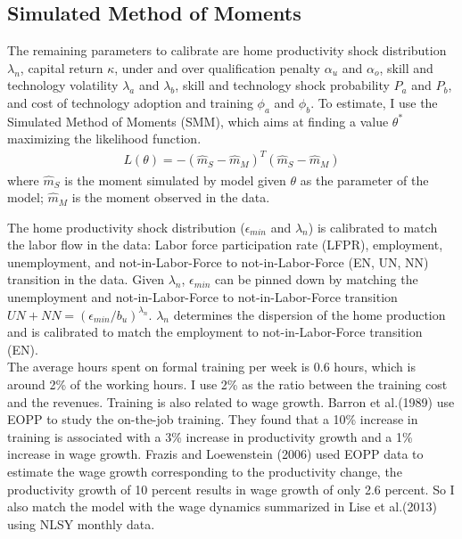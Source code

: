 \documentclass[12pt]{article}
\newcommand{\1}{\mathbb{1}}
\begin{document}
\subsection{Simulated Method of Moments}
The remaining parameters to calibrate are home productivity shock distribution $\lambda_n$, capital return $\kappa$, under and over qualification penalty $\alpha_u$ and $\alpha_o$, skill and technology volatility $\lambda_a$ and $\lambda_b$, skill and technology shock probability $P_a$ and $P_b$, and cost of technology adoption and training $\phi_a$ and $\phi_b$. To estimate, I use the Simulated Method of Moments (SMM), which aims at finding a value $\theta^*$ maximizing the likelihood function. 
\begin{align*}
L(\theta) = -(\hat{m}_S-\hat{m}_M)^T(\hat{m}_S-\hat{m}_M)
\end{align*}
where $\hat{m}_S$ is the moment simulated by model given $\theta$ as the parameter of the model; $\hat{m}_M$ is the moment observed in the data. 

The home productivity shock distribution ($\epsilon_{min}$ and $\lambda_n$) is calibrated to match the labor flow in the data: Labor force participation rate (LFPR), employment, unemployment, and not-in-Labor-Force to not-in-Labor-Force (EN, UN, NN) transition in the data. Given $\lambda_n$, $\epsilon_{min}$ can be pinned down by matching the unemployment and not-in-Labor-Force to not-in-Labor-Force transition $UN+NN = (\epsilon_{min}/b_u)^{\lambda_n}$. $\lambda_n$ determines the dispersion of the home production and is calibrated to match the employment to not-in-Labor-Force transition (EN). \\

The average hours spent on formal training per week is 0.6 hours, which is around 2\% of the working hours. I use 2\% as the ratio between the training cost and the revenues. Training is also related to wage growth. Barron et al.(1989)\cite{Barronetal1989
} use EOPP to study the on-the-job training. They found that a 10\% increase in training is associated with a 3\% increase in productivity growth and a 1\% increase in wage growth. Frazis and Loewenstein (2006)\cite{FrazisLoewenstein2006} used EOPP data to estimate the wage growth corresponding to the productivity change, the productivity growth of 10 percent results in wage growth of only 2.6 percent. So I also match the model with the wage dynamics summarized in Lise et al.(2013)\cite{Liseetal2013} using NLSY monthly data.  \\
\end{document}
